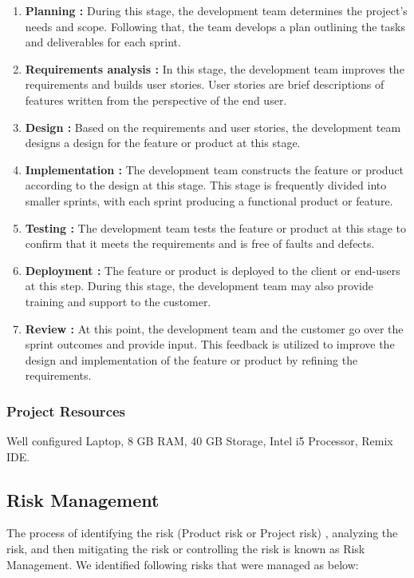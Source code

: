 \documentclass[oneside, 12pt]{book}
\begin{document}
\begin{enumerate}
	\item \textbf{Planning :} During this stage, the development team determines the project's needs and scope. Following that, the team develops a plan outlining the tasks and deliverables for each sprint.
	\item \textbf{Requirements analysis :} In this stage, the development team improves the requirements and builds user stories. User stories are brief descriptions of features written from the perspective of the end user.
	\item \textbf{Design :} Based on the requirements and user stories, the development team designs a design for the feature or product at this stage.
	\newpage
	\item \textbf{Implementation :} The development team constructs the feature or product according to the design at this stage. This stage is frequently divided into smaller sprints, with each sprint producing a functional product or feature.
	\item \textbf{Testing :} The development team tests the feature or product at this stage to confirm that it meets the requirements and is free of faults and defects.
	\item \textbf{Deployment :} The feature or product is deployed to the client or end-users at this step. During this stage, the development team may also provide training and support to the customer.
	\item \textbf{Review :} At this point, the development team and the customer go over the sprint outcomes and provide input. This feedback is utilized to improve the design and implementation of the feature or product by refining the requirements.
\end{enumerate}
\subsubsection{Project Resources}
Well configured Laptop, 8 GB RAM, 40 GB Storage, Intel i5 Processor, Remix IDE.
\subsection{Risk Management}
The process of identifying the risk (Product risk or Project risk) , analyzing the risk, and then mitigating the risk or controlling the risk is known as Risk Management. We identified following risks that were managed as below:
\end{document}
